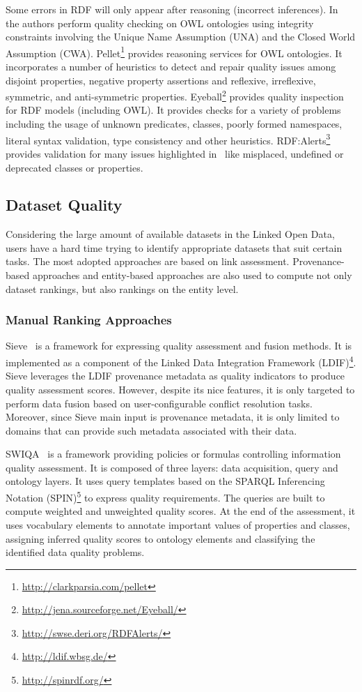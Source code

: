 Some errors in RDF will only appear after reasoning (incorrect inferences). In~\cite{Sirin:OWLED:08,Tao:HICSS:09} the authors perform quality checking on OWL ontologies using integrity constraints involving the Unique Name Assumption (UNA) and the Closed World Assumption (CWA). Pellet\footnote{\url{http://clarkparsia.com/pellet}} provides reasoning services for OWL ontologies. It incorporates a number of heuristics to detect and repair quality issues among disjoint properties, negative property assertions and reflexive, irreflexive, symmetric, and anti-symmetric properties. Eyeball\footnote{\url{http://jena.sourceforge.net/Eyeball/}} provides quality inspection for RDF models (including OWL). It provides checks for a variety of problems including the usage of unknown predicates, classes, poorly formed namespaces, literal syntax validation, type consistency and other heuristics. RDF:Alerts\footnote{\url{http://swse.deri.org/RDFAlerts/}} provides validation for many issues highlighted in~\cite{Hogan:LDOW:10} like misplaced, undefined or deprecated classes or properties.

\subsection{Dataset Quality}
Considering the large amount of available datasets in the Linked Open Data, users have a hard time trying to identify appropriate datasets that suit certain tasks. The most adopted approaches are based on link assessment. Provenance-based approaches and entity-based approaches are also used to compute not only dataset rankings, but also rankings on the entity level.

\subsubsection{Manual Ranking Approaches}
Sieve~\cite{Mendes:EDBT:12} is a framework for expressing quality assessment and fusion methods. It is implemented as a component of the Linked Data Integration Framework (LDIF)\footnote{\url{http://ldif.wbsg.de/}}. Sieve leverages the LDIF provenance metadata as quality indicators to produce quality assessment scores. However, despite its nice features, it is only targeted to perform data fusion based on user-configurable conflict resolution tasks. Moreover, since Sieve main input is provenance metadata, it is only limited to domains that can provide such metadata associated with their data.

SWIQA~\cite{Furber:ECIS:11} is a framework providing policies or formulas controlling information quality assessment. It is composed of three layers: data acquisition, query and ontology layers. It uses query templates based on the SPARQL Inferencing Notation (SPIN)\footnote{\url{http://spinrdf.org/}} to express quality requirements. The queries are built to compute weighted and unweighted quality scores. At the end of the assessment, it uses vocabulary elements to annotate important values of properties and classes, assigning inferred quality scores to ontology elements and classifying the identified data quality problems.

